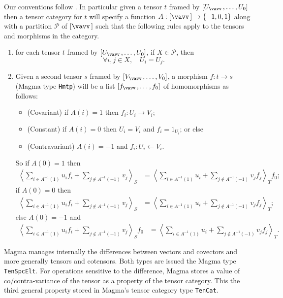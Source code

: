 Our conventions follow \cite{Wilson:division}.  In particular given
a tensor $t$ framed by $[U_{\vav},\dots,U_0]$ then a tensor category for
$t$ will specify a function $A:[\vav]\to \{-1,0,1\}$ along with
a partition $\mathcal{P}$ of $[\vav]$ such that the following 
rules apply to the tensors and morphisms in the category.
\begin{enumerate}
\item for each tensor $t$ framed by $[U_{\vav},\dots,U_0]$, if
$X\in\mathcal{P}$, then 
$$\forall i,j\in X,\quad U_i=U_j.$$

\item Given a second tensor $s$ framed by $[V_{\vav},\dots,V_0]$,
a morphism $f:t\to s$ (Magma type {\tt Hmtp}) will be a list
$[f_{\vav},\dots,f_0]$ of homomorphisms as follows:
\begin{itemize}
\item (Covariant) if $A(i)=1$ then $f_i:U_i\to V_i$;
\item (Constant) if $A(i)=0$ then $U_i=V_i$ and $f_i=1_{U_i}$; or else
\item (Contravariant) $A(i)=-1$ and $f_i:U_i\leftarrow V_i$.
\end{itemize}
So if $A(0)=1$ then
\begin{align*}
	\left\langle \sum_{i\in A^{-1}(1)} u_i f_i
		+\sum_{j\not\in A^{-1}(-1)} v_j\right\rangle_S
		& = \left\langle  \sum_{i\in A^{-1}(1)} u_i 
		+\sum_{j\not\in A^{-1}(-1)} v_j f_j\right\rangle_T f_0;
\end{align*}
if $A(0)=0$ then
\begin{align*}
	\left\langle \sum_{i\in A^{-1}(1)} u_i f_i
		+\sum_{j\not\in A^{-1}(-1)} v_j\right\rangle_S
		& = \left\langle  \sum_{i\in A^{-1}(1)} u_i 
		+\sum_{j\not\in A^{-1}(-1)} v_j f_j\right\rangle_T;
\end{align*}
else $A(0)=-1$ and 
\begin{align*}
	\left\langle \sum_{i\in A^{-1}(1)} u_i f_i
		+\sum_{j\not\in A^{-1}(-1)} v_j\right\rangle_S f_0
		& = \left\langle  \sum_{i\in A^{-1}(1)} u_i 
		+\sum_{j\not\in A^{-1}(-1)} v_j f_j\right\rangle_T.
\end{align*}
\end{enumerate}

Magma manages internally the differences between 
vectors and covectors and more generally tensors and cotensors.
Both types are issued the Magma type {\tt TenSpcElt}.
For operations sensitive to the difference, Magma stores a value of
co/contra-variance of the tensor as a property of the tensor category.
This the third general property stored in Magma's tensor category type
{\tt TenCat}.

